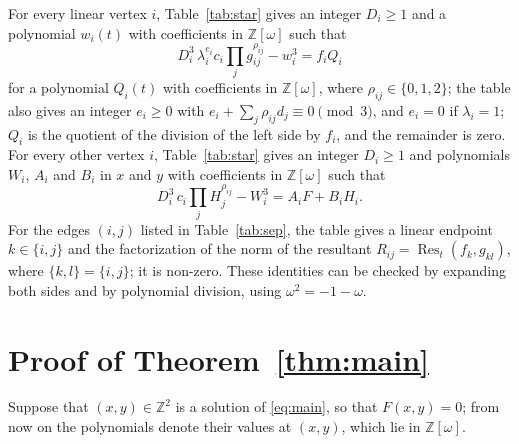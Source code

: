 \documentclass[11pt]{article}
\newcommand{\Z}{\mathbb{Z}}
\begin{document}
For every linear vertex $i$, Table~\ref{tab:star} gives an integer $D_i\geq1$ and a polynomial $w_i(t)$ with coefficients in $\Z[\omega]$ such that
\begin{equation}\label{eq:starlin}
D_i^3\,\lambda_i^{e_i}c_i\prod_jg_{ij}^{\rho_{ij}}-w_i^3=f_iQ_i
\end{equation}
for a polynomial $Q_i(t)$ with coefficients in $\Z[\omega]$, where $\rho_{ij}\in\{0,1,2\}$; the table also gives an integer $e_i\geq0$ with $e_i+\sum_j\rho_{ij}d_j\equiv0\pmod3$, and $e_i=0$ if $\lambda_i=1$; $Q_i$ is the quotient of the division of the left side by $f_i$, and the remainder is zero.
For every other vertex $i$, Table~\ref{tab:star} gives an integer $D_i\geq1$ and polynomials $W_i$, $A_i$ and $B_i$ in $x$ and $y$ with coefficients in $\Z[\omega]$ such that
\begin{equation}\label{eq:star}
D_i^3\,c_i\prod_jH_j^{\rho_{ij}}-W_i^3=A_iF+B_iH_i.
\end{equation}
For the edges $(i,j)$ listed in Table~\ref{tab:sep}, the table gives a linear endpoint $k\in\{i,j\}$ and the factorization of the norm of the resultant $R_{ij}=\operatorname{Res}_t(f_k,g_{kl})$, where $\{k,l\}=\{i,j\}$; it is non-zero.
These identities can be checked by expanding both sides and by polynomial division, using $\omega^2=-1-\omega$.

\section{Proof of Theorem~\ref{thm:main}}

Suppose that $(x,y)\in\Z^2$ is a solution of \eqref{eq:main}, so that $F(x,y)=0$; from now on the polynomials denote their values at $(x,y)$, which lie in $\Z[\omega]$.
\end{document}
